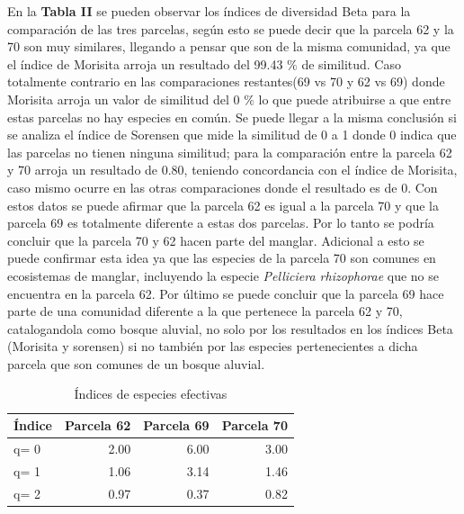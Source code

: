 \documentclass[conference,final,12pt,]{IEEEtran}
\begin{document}
En la \textbf{Tabla II} se pueden observar los índices de diversidad Beta
para la comparación de las tres parcelas, según esto se puede decir que
la parcela 62 y la 70 son muy similares, llegando a pensar que son de la
misma comunidad, ya que el índice de Morisita arroja un resultado del
99.43 \(\%\) de similitud. Caso totalmente contrario en las
comparaciones restantes(69 vs 70 y 62 vs 69) donde Morisita arroja un
valor de similitud del 0 \(\%\) lo que puede atribuirse a que entre
estas parcelas no hay especies en común. Se puede llegar a la misma
conclusión si se analiza el índice de Sorensen que mide la similitud de
0 a 1 donde 0 indica que las parcelas no tienen ninguna similitud; para
la comparación entre la parcela 62 y 70 arroja un resultado de 0.80,
teniendo concordancia con el índice de Morisita, caso mismo ocurre en
las otras comparaciones donde el resultado es de 0. Con estos datos se
puede afirmar que la parcela 62 es igual a la parcela 70 y que la
parcela 69 es totalmente diferente a estas dos parcelas. Por lo tanto se
podría concluir que la parcela 70 y 62 hacen parte del manglar.
Adicional a esto se puede confirmar esta idea ya que las especies de la
parcela 70 son comunes en ecosistemas de manglar, incluyendo la especie
\emph{Pelliciera rhizophorae} \citep{Y} que no se encuentra en la parcela
62. Por último se puede concluir que la parcela 69 hace parte de una
comunidad diferente a la que pertenece la parcela 62 y 70, catalogandola
como bosque aluvial, no solo por los resultados en los índices Beta
(Morisita y sorensen) si no también por las especies pertenecientes a
dicha parcela que son comunes de un bosque aluvial\citep{Y}.

\begin{table}

\caption{\label{tab:unnamed-chunk-4}Índices de especies efectivas}
\centering
\begin{tabular}[t]{l|r|r|r}
\hline
Índice & Parcela 62 & Parcela 69 & Parcela 70\\
\hline
q= 0 & 2.00 & 6.00 & 3.00\\
\hline
q= 1 & 1.06 & 3.14 & 1.46\\
\hline
q= 2 & 0.97 & 0.37 & 0.82\\
\hline
\end{tabular}
\end{table}
\end{document}
